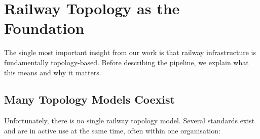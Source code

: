 \documentclass{ceurart}
\begin{document}
\section{Railway Topology as the Foundation}
\label{sec:topology}

The single most important insight from our work is that railway infrastructure
is fundamentally topology-based. Before describing the pipeline, we explain what
this means and why it matters.

\subsection{Many Topology Models Coexist}

Unfortunately, there is no single railway topology model. Several standards
exist and are in active use at the same time, often within one organisation:
\end{document}
